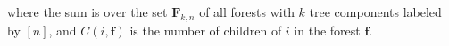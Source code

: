 where the sum is over the set $\mathbf{F}_{k,n}$ of all forests with $k$ tree components labeled by $[n]$, and $C(i,\mathbf{f})$ is the number of children of $i$ in the forest $\mathbf{f}$.
